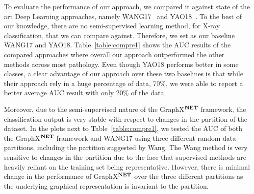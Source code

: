 \documentclass[runningheads]{llncs}
\begin{document}
To evaluate the performance of our approach, we compared it against state of the art Deep Learning approaches, namely WANG17~\cite{wang2017chestx} and YAO18~\cite{yao2018weakly}. To the best of our knowledge, there are no semi-supervised learning method, for X-ray classification, that we can compare against. Therefore, we set as our baseline WANG17 and YAO18.
Table~\ref{table:compre1} shows the AUC results of the compared approaches where overall our approach outperformed the other methods across most pathology. Even though YAO18 performs better in some classes, a clear advantage of our approach over these two baselines is that while their approach rely in a huge percentage of data, 70\%, we were able to report a better average AUC result with only 20\% of the data.

Moreover, due to the semi-supervised nature of the GraphX$^{\textbf{\scriptsize NET}}$ framework, the classification output is very stable with respect to changes in the partition of the dataset. In the plots next to Table~\ref{table:compre1}, we tested the AUC of both the GraphX$^{\textbf{\scriptsize NET}}$ framework and WANG17 \cite{wang2017chestx} using three different random data partitions, including the partition suggested by Wang. The Wang method is very sensitive to changes in the partition due to the face that supervised methods are heavily reliant on the training set being representative. However, there is minimal change in the performance of GraphX$^{\textbf{\scriptsize NET}}$ over the three different partitions as the underlying graphical representation is invariant to the partition.
\end{document}
